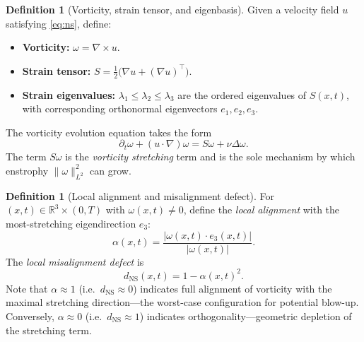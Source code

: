 \documentclass[11pt]{article}
\theoremstyle{definition}
\newtheorem{definition}[theorem]{Definition}
\theoremstyle{remark}
\newcommand{\R}{\mathbb{R}}
\begin{document}
\begin{definition}[Vorticity, strain tensor, and eigenbasis]
\label{def:vorticity-strain}
Given a velocity field $u$ satisfying \eqref{eq:ns}, define:
\begin{itemize}[leftmargin=2em]
\item \textbf{Vorticity:} $\omega = \nabla \times u$.
\item \textbf{Strain tensor:} $S = \tfrac{1}{2}\bigl(\nabla u + (\nabla u)^{\!\top}\bigr)$.
\item \textbf{Strain eigenvalues:} $\lambda_1 \leq \lambda_2 \leq \lambda_3$
  are the ordered eigenvalues of $S(x,t)$, with corresponding orthonormal
  eigenvectors $e_1, e_2, e_3$.
\end{itemize}
The vorticity evolution equation takes the form
\begin{equation}\label{eq:vorticity-evolution}
\partial_t \omega + (u \cdot \nabla)\omega = S\omega + \nu \Delta \omega.
\end{equation}
The term $S\omega$ is the \emph{vorticity stretching} term and is the
sole mechanism by which enstrophy $\|\omega\|_{L^2}^2$ can grow.
\end{definition}

\begin{definition}[Local alignment and misalignment defect]
\label{def:alignment-defect}
For $(x,t) \in \R^3 \times (0,T)$ with $\omega(x,t) \neq 0$, define the
\emph{local alignment} with the most-stretching eigendirection $e_3$:
\begin{equation}\label{eq:alpha}
\alpha(x,t) = \frac{|\omega(x,t) \cdot e_3(x,t)|}{|\omega(x,t)|}.
\end{equation}
The \emph{local misalignment defect} is
\begin{equation}\label{eq:d-ns}
d_{\mathrm{NS}}(x,t) = 1 - \alpha(x,t)^2.
\end{equation}
Note that $\alpha \approx 1$ (i.e.\ $d_{\mathrm{NS}} \approx 0$) indicates
full alignment of vorticity with the maximal stretching direction---the
worst-case configuration for potential blow-up.  Conversely,
$\alpha \approx 0$ (i.e.\ $d_{\mathrm{NS}} \approx 1$) indicates
orthogonality---geometric depletion of the stretching term.
\end{definition}
\end{document}
